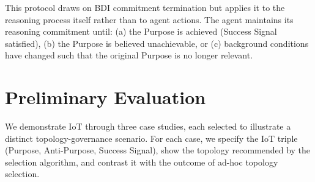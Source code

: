 \documentclass[11pt,a4paper]{article}
\begin{document}
\noindent{}

This protocol draws on BDI commitment termination but applies it to the reasoning process itself rather than to agent actions. The agent maintains its reasoning commitment until: (a) the Purpose is achieved (Success Signal satisfied), (b) the Purpose is believed unachievable, or (c) background conditions have changed such that the original Purpose is no longer relevant.

\section{Preliminary Evaluation}

We demonstrate IoT through three case studies, each selected to illustrate a distinct topology-governance scenario. For each case, we specify the IoT triple (Purpose, Anti-Purpose, Success Signal), show the topology recommended by the selection algorithm, and contrast it with the outcome of ad-hoc topology selection.
\end{document}
